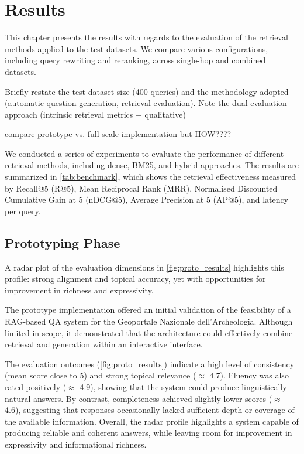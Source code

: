 \chapter{Results}
\label{chap:results}
\begin{spacing}{1.5}

This chapter presents the results with regards to the evaluation of the retrieval methods applied to the test datasets. We compare various configurations, including query rewriting and reranking, across single-hop and combined datasets.

Briefly restate the test dataset size (400 queries) and the methodology adopted (automatic question generation, retrieval evaluation).
Note the dual evaluation approach (intrinsic retrieval metrics + qualitative)

compare prototype vs. full-scale implementation but HOW????

We conducted a series of experiments to evaluate the performance of different retrieval methods, including dense, BM25, and hybrid approaches. The results are summarized in \autoref{tab:benchmark}, which shows the retrieval effectiveness measured by Recall@5 (R@5), Mean Reciprocal Rank (MRR), Normalised Discounted Cumulative Gain at 5 (nDCG@5), Average Precision at 5 (AP@5), and latency per query.


\section{Prototyping Phase}

A radar plot of the evaluation dimensions in \autoref{fig:proto_results} highlights this profile: strong alignment and topical accuracy, yet with opportunities for improvement in richness and expressivity.

The prototype implementation offered an initial validation of the feasibility of a RAG-based QA system for the Geoportale Nazionale dell’Archeologia. Although limited in scope, it demonstrated that the architecture could effectively combine retrieval and generation within an interactive interface.

The evaluation outcomes (\autoref{fig:proto_results}) indicate a high level of consistency (mean score close to 5) and strong topical relevance ($\approx$ 4.7). Fluency was also rated positively ($\approx$ 4.9), showing that the system could produce linguistically natural answers. By contrast, completeness achieved slightly lower scores ($\approx$ 4.6), suggesting that responses occasionally lacked sufficient depth or coverage of the available information. Overall, the radar profile highlights a system capable of producing reliable and coherent answers, while leaving room for improvement in expressivity and informational richness.


\end{spacing}
